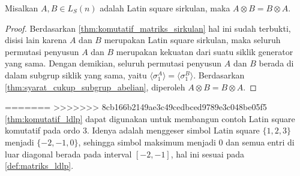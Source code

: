 \begin{akibat}\label{akibat:latin_square_sirkulan_komutatif}
  Misalkan $A,B\in L_S(n)$ adalah Latin square sirkulan, maka $A\otimes B=B\otimes A$.
\end{akibat}

\begin{proof}
  Berdasarkan \autoref{thm:komutatif_matriks_sirkulan} hal ini sudah terbukti, disisi lain karena $A$ dan $B$ merupakan Latin square sirkulan, maka seluruh permutasi penyusun $A$ dan $B$ merupakan kekuatan dari suatu siklik generator yang sama. Dengan demikian, seluruh permutasi penyusun $A$ dan $B$ berada di dalam subgrup siklik yang sama, yaitu $\langle \sigma_1^A\rangle=\langle \sigma_1^B\rangle$. Berdasarkan \autoref{thm:syarat_cukup_subgrup_abelian}, diperoleh $A\otimes B=B\otimes A$.
\end{proof}

=======
>>>>>>> 8cb166b2149ae3c49cedbced9789e3c048be05f5
\autoref{thm:komutatif_ldlp} dapat digunakan untuk membangun contoh Latin
square komutatif pada ordo $3$. Idenya adalah menggeser simbol Latin square
$\{1,2,3\}$ menjadi $\{-2,-1,0\}$, sehingga simbol maksimum menjadi $0$ dan
semua entri di luar diagonal berada pada interval $[-2,-1]$, hal ini sesuai pada
\autoref{def:matriks_ldlp}.

